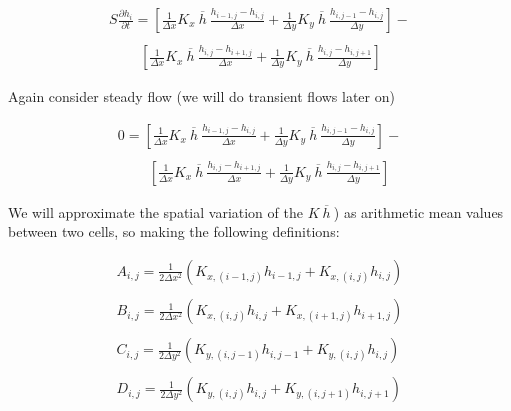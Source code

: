 \begin{equation}
\begin{matrix}
S \frac{\partial h_i}{\partial t} = 
[\frac{1}{\Delta x} K_{x}~\overline{h}~ \frac{h_{i-1,j} - h_{i,j}}{\Delta x} +
 \frac{1}{\Delta y} K_{y}~\overline{h}~ \frac{h_{i,j-1} - h_{i,j}}{\Delta y}] - \\
~~~~~~~~~~\\
~~~~~~~~~~[ \frac{1}{\Delta x} K_{x}~\overline{h}~  \frac{h_{i,j} - h_{i+1,j}}{\Delta x} +
  \frac{1}{\Delta y}  K_{y}~\overline{h}~ \frac{h_{i,j} - h_{i,j+1}}{\Delta y} ]        
\end{matrix}        
\end{equation}

Again consider steady flow (we will do transient flows later on)

\begin{equation}
\begin{matrix}
0 = 
[\frac{1}{\Delta x} K_{x}~\overline{h}~ \frac{h_{i-1,j} - h_{i,j}}{\Delta x} +
 \frac{1}{\Delta y} K_{y}~\overline{h}~ \frac{h_{i,j-1} - h_{i,j}}{\Delta y}] - \\
~~~~~~~~~~\\
~~~~~~~~~~[ \frac{1}{\Delta x} K_{x}~\overline{h}~  \frac{h_{i,j} - h_{i+1,j}}{\Delta x} +
  \frac{1}{\Delta y}  K_{y}~\overline{h}~ \frac{h_{i,j} - h_{i,j+1}}{\Delta y} ]        
\end{matrix}        
\end{equation}

We will approximate the spatial variation of the $K~\overline{h}~$) as arithmetic mean values between two cells, so making the following definitions:

\begin{equation}
\begin{matrix}
A_{i,j} = \frac{1}{2 \Delta x^2}(K_{x,(i-1,j)} h_{i-1,j}+K_{x,(i,j)}h_{i,j}) \\ ~~ \\
B_{i,j} = \frac{1}{2 \Delta x^2}(K_{x,(i,j)}h_{i,j}+K_{x,(i+1,j)}h_{i+1,j})   \\ ~~ \\
C_{i,j} = \frac{1}{2 \Delta y^2}(K_{y,(i,j-1)}h_{i,j-1}+K_{y,(i,j)}h_{i,j})   \\ ~~ \\
D_{i,j} = \frac{1}{2 \Delta y^2}(K_{y,(i,j)}h_{i,j}+K_{y,(i,j+1)}h_{i,j+1})   \\ ~~ \\
\end{matrix}
\end{equation}

